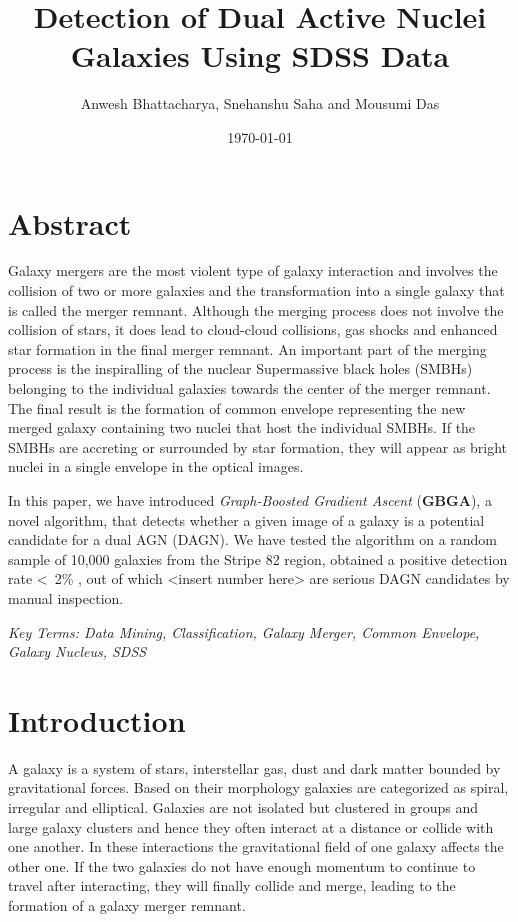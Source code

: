 \documentclass[12pt]{article}
\begin{document}
\title{\textbf{Detection of Dual Active Nuclei Galaxies Using SDSS Data}}
\author{Anwesh Bhattacharya, Snehanshu Saha and Mousumi Das}
\date{\today}
\maketitle

\section{Abstract}

Galaxy mergers are the most violent type of galaxy interaction and involves
the collision of two or more galaxies and the transformation into a single
galaxy that is called the merger remnant. Although the merging process does not
involve the collision of stars, it does lead to cloud-cloud collisions, gas shocks
and enhanced star formation in the final merger remnant. An important part of the
merging process is the inspiralling of the nuclear Supermassive black holes (SMBHs) 
belonging to the individual galaxies towards the center of the merger remnant. The final result is the formation of common envelope representing the new merged galaxy 
containing two nuclei that host the individual SMBHs. If the SMBHs are accreting 
or surrounded by star formation, they will appear as bright nuclei in a single envelope 
in the optical images.

\bigskip

In this paper, we have introduced \textit{Graph-Boosted Gradient Ascent} (\textbf{GBGA}), a novel algorithm, that detects whether a given image of a galaxy is a potential candidate for a dual AGN (DAGN). We have tested the algorithm on a random sample of 10,000 galaxies from the Stripe 82\cite{abazajian}
region, obtained a positive detection rate \textless \ 2\% , out of which <insert number here> are serious DAGN candidates by manual inspection.

\bigskip

\textit{Key Terms: Data Mining, Classification, Galaxy Merger, Common Envelope, Galaxy Nucleus, SDSS}
 
\section{Introduction}

A galaxy is a system of stars, interstellar gas, dust and dark matter bounded
by gravitational forces. Based on their morphology galaxies are categorized as
spiral, irregular and elliptical. Galaxies are not isolated but clustered in 
groups and large galaxy clusters and hence they often interact at a distance or collide
with one another. In these interactions the gravitational field of one galaxy affects the other one. If the two galaxies do not have enough momentum to continue to travel after interacting, they will finally collide and merge, leading to the formation 
of a galaxy merger remnant.
\end{document}
